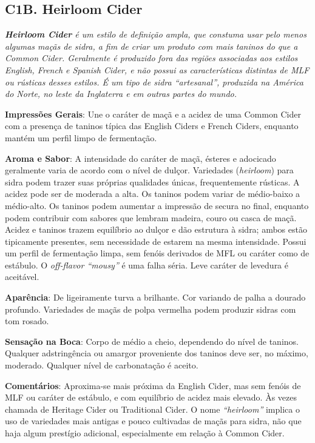 \subsection*{C1B. Heirloom Cider}

\textit{\textbf{Heirloom Cider} é um estilo de definição ampla, que constuma usar pelo menos algumas maçãs de sidra, a fim de criar um produto com mais taninos do que a Common Cider. Geralmente é produzido fora das regiões associadas aos estilos English, French e Spanish Cider, e não possui as características distintas de MLF ou rústicas desses estilos. É um tipo de sidra “artesanal”, produzida na América do Norte, no leste da Inglaterra e em outras partes do mundo.}

\textbf{Impressões Gerais}: Une o caráter de maçã e a acidez de uma Common Cider com a presença de taninos típica das English Ciders e French Ciders, enquanto mantém um perfil limpo de fermentação.

\textbf{Aroma e Sabor}: A intensidade do caráter de maçã, ésteres e adocicado geralmente varia de acordo com o nível de dulçor. Variedades (\textit{heirloom}) para sidra podem trazer suas próprias qualidades únicas, frequentemente rústicas. A acidez pode ser de moderada a alta. Os taninos podem variar de médio-baixo a médio-alto. Os taninos podem aumentar a impressão de secura no final, enquanto podem contribuir com sabores que lembram madeira, couro ou casca de maçã. Acidez e taninos trazem equilíbrio ao dulçor e dão estrutura à sidra; ambos estão tipicamente presentes, sem necessidade de estarem na mesma intensidade. Possui um perfil de fermentação limpa, sem fenóis derivados de MFL ou caráter como de estábulo. O \textit{off-flavor “mousy”} é uma falha séria. Leve caráter de levedura é aceitável.

\textbf{Aparência}: De ligeiramente turva a brilhante. Cor variando de palha a dourado profundo. Variedades de maçãs de polpa vermelha podem produzir sidras com tom rosado.

\textbf{Sensação na Boca}: Corpo de médio a cheio, dependendo do nível de taninos. Qualquer adstringência ou amargor proveniente dos taninos deve ser, no máximo, moderado. Qualquer nível de carbonatação é aceito.

\textbf{Comentários}: Aproxima-se mais próxima da English Cider, mas sem fenóis de MLF ou caráter de estábulo, e com equilíbrio de acidez mais elevado. Às vezes chamada de Heritage Cider ou Traditional Cider. O nome \textit{“heirloom”} implica o uso de variedades mais antigas e pouco cultivadas de maçãs para sidra, não que haja algum prestígio adicional, especialmente em relação à Common Cider.

